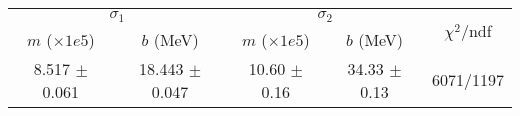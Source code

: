 \begin{tabular}{cc|cc||c}
\multicolumn{2}{c|}{$\sigma_1$} & \multicolumn{2}{|c}{$\sigma_2$} & \multirow{2}{*}{$\chi^2/$ndf} \\
$m$ ($\times1e5$) & $b$ (MeV) & $m$ ($\times1e5$) & $b$ (MeV) & \\
\hline
8.517 $\pm$ 0.061 & 18.443 $\pm$ 0.047 & 10.60 $\pm$ 0.16 & 34.33 $\pm$ 0.13 & 6071/1197\\
\end{tabular}
